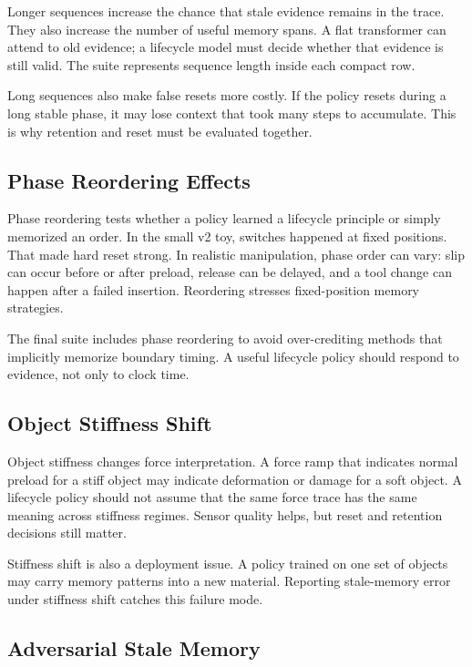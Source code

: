 \documentclass{article}
\begin{document}
Longer sequences increase the chance that stale evidence remains in the trace.
They also increase the number of useful memory spans. A flat transformer can
attend to old evidence; a lifecycle model must decide whether that evidence is
still valid. The suite represents sequence length inside each compact row.

Long sequences also make false resets more costly. If the policy resets during
a long stable phase, it may lose context that took many steps to accumulate.
This is why retention and reset must be evaluated together.

\subsection{Phase Reordering Effects}

Phase reordering tests whether a policy learned a lifecycle principle or simply
memorized an order. In the small v2 toy, switches happened at fixed positions.
That made hard reset strong. In realistic manipulation, phase order can vary:
slip can occur before or after preload, release can be delayed, and a tool
change can happen after a failed insertion. Reordering stresses fixed-position
memory strategies.

The final suite includes phase reordering to avoid over-crediting methods that
implicitly memorize boundary timing. A useful lifecycle policy should respond
to evidence, not only to clock time.

\subsection{Object Stiffness Shift}

Object stiffness changes force interpretation. A force ramp that indicates
normal preload for a stiff object may indicate deformation or damage for a soft
object. A lifecycle policy should not assume that the same force trace has the
same meaning across stiffness regimes. Sensor quality helps, but reset and
retention decisions still matter.

Stiffness shift is also a deployment issue. A policy trained on one set of
objects may carry memory patterns into a new material. Reporting stale-memory
error under stiffness shift catches this failure mode.

\subsection{Adversarial Stale Memory}
\end{document}
